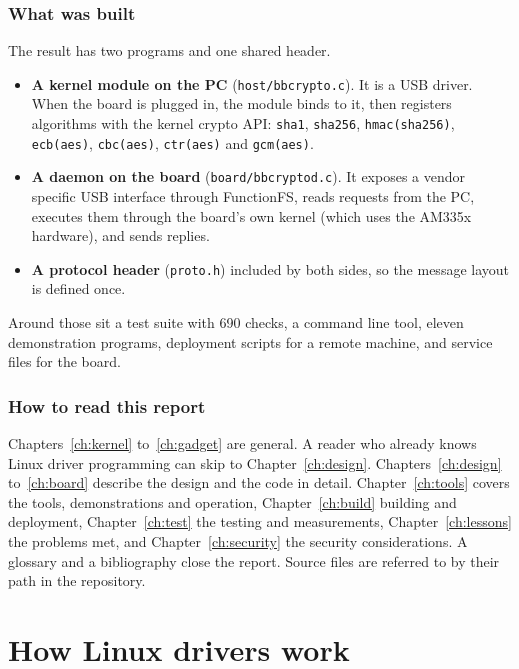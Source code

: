 \documentclass[11pt,a4paper,oneside]{report}
\newcommand{\code}[1]{\texttt{\small #1}}
\begin{document}
\section{What was built}

The result has two programs and one shared header.

\begin{itemize}
  \item \textbf{A kernel module on the PC} (\code{host/bbcrypto.c}). It is a USB driver. When the board is plugged in, the module binds to it, then registers algorithms with the kernel crypto API: \code{sha1}, \code{sha256}, \code{hmac(sha256)}, \code{ecb(aes)}, \code{cbc(aes)}, \code{ctr(aes)} and \code{gcm(aes)}.
  \item \textbf{A daemon on the board} (\code{board/bbcryptod.c}). It exposes a vendor specific USB interface through FunctionFS, reads requests from the PC, executes them through the board's own kernel (which uses the AM335x hardware), and sends replies.
  \item \textbf{A protocol header} (\code{proto.h}) included by both sides, so the message layout is defined once.
\end{itemize}

Around those sit a test suite with 690 checks, a command line tool, eleven demonstration programs, deployment scripts for a remote machine, and service files for the board.

\section{How to read this report}

Chapters~\ref{ch:kernel} to~\ref{ch:gadget} are general. A reader who already knows Linux driver programming can skip to Chapter~\ref{ch:design}. Chapters~\ref{ch:design} to~\ref{ch:board} describe the design and the code in detail. Chapter~\ref{ch:tools} covers the tools, demonstrations and operation, Chapter~\ref{ch:build} building and deployment, Chapter~\ref{ch:test} the testing and measurements, Chapter~\ref{ch:lessons} the problems met, and Chapter~\ref{ch:security} the security considerations. A glossary and a bibliography close the report. Source files are referred to by their path in the repository.

\part{How Linux drivers work}
\end{document}
